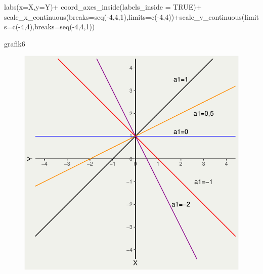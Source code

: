 \documentclass[
  letterpaper,
  DIV=11,
  numbers=noendperiod]{scrartcl}
\newenvironment{Shaded}{\begin{snugshade}}{\end{snugshade}}
\newcommand{\AttributeTok}[1]{\textcolor[rgb]{0.40,0.45,0.13}{#1}}
\newcommand{\ConstantTok}[1]{\textcolor[rgb]{0.56,0.35,0.01}{#1}}
\newcommand{\DecValTok}[1]{\textcolor[rgb]{0.68,0.00,0.00}{#1}}
\newcommand{\FunctionTok}[1]{\textcolor[rgb]{0.28,0.35,0.67}{#1}}
\newcommand{\NormalTok}[1]{\textcolor[rgb]{0.00,0.23,0.31}{#1}}
\newcommand{\SpecialCharTok}[1]{\textcolor[rgb]{0.37,0.37,0.37}{#1}}
\newcommand{\StringTok}[1]{\textcolor[rgb]{0.13,0.47,0.30}{#1}}
\begin{document}
\begin{Shaded}
\begin{Highlighting}[]
  \FunctionTok{labs}\NormalTok{(}\AttributeTok{x=}\StringTok{\textquotesingle{}X\textquotesingle{}}\NormalTok{,}\AttributeTok{y=}\StringTok{\textquotesingle{}Y\textquotesingle{}}\NormalTok{)}\SpecialCharTok{+}
  \FunctionTok{coord\_axes\_inside}\NormalTok{(}\AttributeTok{labels\_inside =} \ConstantTok{TRUE}\NormalTok{)}\SpecialCharTok{+}
  \FunctionTok{scale\_x\_continuous}\NormalTok{(}\AttributeTok{breaks=}\FunctionTok{seq}\NormalTok{(}\SpecialCharTok{{-}}\DecValTok{4}\NormalTok{,}\DecValTok{4}\NormalTok{,}\DecValTok{1}\NormalTok{),}\AttributeTok{limits=}\FunctionTok{c}\NormalTok{(}\SpecialCharTok{{-}}\DecValTok{4}\NormalTok{,}\DecValTok{4}\NormalTok{))}\SpecialCharTok{+}\FunctionTok{scale\_y\_continuous}\NormalTok{(}\AttributeTok{limits=}\FunctionTok{c}\NormalTok{(}\SpecialCharTok{{-}}\DecValTok{4}\NormalTok{,}\DecValTok{4}\NormalTok{),}\AttributeTok{breaks=}\FunctionTok{seq}\NormalTok{(}\SpecialCharTok{{-}}\DecValTok{4}\NormalTok{,}\DecValTok{4}\NormalTok{,}\DecValTok{1}\NormalTok{))}

\NormalTok{grafik6}
\end{Highlighting}
\end{Shaded}

\begin{figure}[H]

{\centering \includegraphics{index_files/figure-pdf/unnamed-chunk-7-1.pdf}

}

\end{figure}
\end{document}

